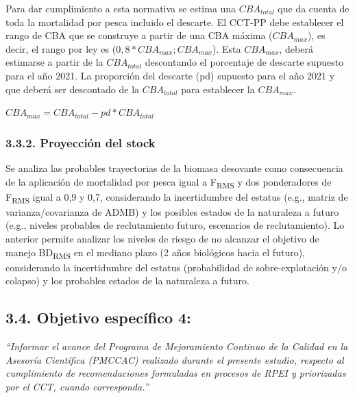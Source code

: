 \documentclass[
  spanish,
]{article}
\begin{document}
Para dar cumplimiento a esta normativa se estima una \(CBA_{total}\) que
da cuenta de toda la mortalidad por pesca incluido el descarte. El
CCT-PP debe establecer el rango de CBA que se construye a partir de una
CBA máxima (\(CBA_{max}\)), es decir, el rango por ley es
(\(0,8*CBA_{max}; CBA_{max}\)). Esta \(CBA_{max}\), deberá estimarse a
partir de la \(CBA_{total}\) descontando el porcentaje de descarte
supuesto para el año 2021. La proporción del descarte (pd) supuesto para
el año 2021 y que deberá ser descontado de la \(CBA_{total}\) para
establecer la \(CBA_{max}\).

\vspace{0.5cm}
\large
\begin{center} 
$CBA_{max}=CBA_{total}-pd*CBA_{total}$
\end{center}
\vspace{0.5cm}

\normalsize

\hypertarget{proyecciuxf3n-del-stock}{%
\subsubsection{3.3.2. Proyección del
stock}\label{proyecciuxf3n-del-stock}}

Se analiza las probables trayectorias de la biomasa desovante como
consecuencia de la aplicación de mortalidad por pesca igual a
F\textsubscript{RMS} y dos ponderadores de F\textsubscript{RMS} igual a
0,9 y 0,7, considerando la incertidumbre del estatus (e.g., matriz de
varianza/covarianza de ADMB) y los posibles estados de la naturaleza a
futuro (e.g., niveles probables de reclutamiento futuro, escenarios de
reclutamiento). Lo anterior permite analizar los niveles de riesgo de no
alcanzar el objetivo de manejo BD\textsubscript{RMS} en el mediano plazo
(2 años biológicos hacia el futuro), considerando la incertidumbre del
estatus (probabilidad de sobre-explotación y/o colapso) y los probables
estados de la naturaleza a futuro.

\pagebreak

\hypertarget{objetivo-especuxedfico-4}{%
\subsection{3.4. Objetivo específico
4:}\label{objetivo-especuxedfico-4}}

\vspace{-0.2cm}

\emph{``Informar el avance del Programa de Mejoramiento Continuo de la
Calidad en la Asesoría Científica (PMCCAC) realizado durante el presente
estudio, respecto al cumplimiento de recomendaciones formuladas en
procesos de RPEI y priorizadas por el CCT, cuando corresponda.''}
\end{document}
